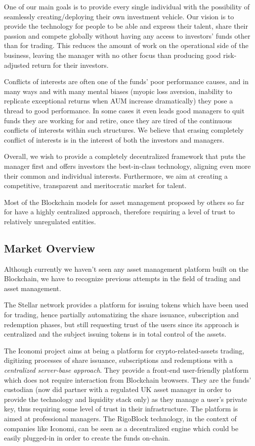 \documentclass[9pt,oneside]{amsart}
\begin{document}
\begin{multicols}{2}
One of our main goals is to provide every single individual with the possibility of seamlessly creating/deploying their own investment vehicle. Our vision is to provide the technology for people to be able and express their talent, share their passion and compete globally without having any access to investors' funds other than for trading. This reduces the amount of work on the operational side of the business, leaving the manager with no other focus than producing good risk-adjusted return for their investors.

Conflicts of interests are often one of the funds' poor performance causes, and in many ways and with many mental biases (myopic loss aversion, inability to replicate exceptional returns when AUM increase dramatically) they pose a thread to good performance. In some cases it even leads good managers to quit funds they are working for and retire, once they are tired of the continuous conflicts of interests within such structures. We believe that erasing completely conflict of interests is in the interest of both the investors and managers.

Overall, we wish to provide a completely decentralized framework that puts the manager first and offers investors the best-in-class technology, aligning even more their common and individual interests. Furthermore, we aim at creating a competitive, transparent and meritocratic market for talent.

Most of the Blockchain models for asset management proposed by others so far for have a highly centralized approach, therefore requiring a level of trust to relatively unregulated entities.

\subsection{Market Overview} \label{ch:previous}

Although currently we haven't seen any asset management platform built on the Blockchain, we have to recognize previous attempts in the field of trading and asset management.

The Stellar network provides a platform for issuing tokens which have been used for trading, hence partially automatizing the share issuance, subscription and redemption phases, but still requesting trust of the users since its approach is centralized and the subject issuing tokens is in total control of the assets.

The Iconomi project aims at being a platform for crypto-related-assets trading, digitizing processes of share issuance, subscriptions and redemptions with a \textit{centralized server-base approach}. They provide a front-end user-friendly platform which does not require interaction from Blockchain browsers. They are the funds' custodian (now did partner with a regulated UK asset manager in order to provide the technology and liquidity stack only) as they manage a user’s private key, thus requiring some level of trust in their infrastructure. The platform is aimed at professional managers. The RigoBlock technology, in the context of companies like Iconomi, can be seen as a decentralized engine which could be easily plugged-in in order to create the funds on-chain.


\end{multicols}
\end{document}
